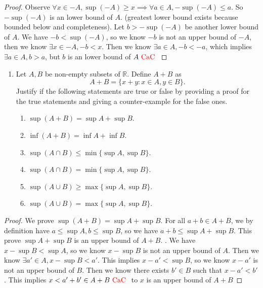\documentclass{report}
\begin{document}
\begin{proof}
Observe $\forall x\in -A, \sup (-A)\geq  x\implies \forall a \in A, -\sup (-A)\leq  a$. So $-\sup (-A)$ is an lower bound of $A$.  (greatest lower bound exists because bounded below and completeness). Let $b>-\sup (-A)$ be another lower bound of $A$. We have $-b<\sup (-A)$, so we know $-b$ is not an upper bound of $-A$, then we know  $\exists x \in -A, -b<x$. Then we know $\exists a \in A, -b<-a$, which implies $\exists a \in A, b>a$, but $b$ is an lower bound of $A\text{ \textcolor{red}{CaC} }$
\end{proof}
\begin{question}{}{}
\begin{enumerate}
    \item Let \( A, B \) be non-empty subsets of \( \mathbb{R} \). Define \( A+B \) as 
    \[ A+B = \{ x+y : x \in A, y \in B \}. \]
    Justify if the following statements are true or false by providing a proof for the true statements and giving a counter-example for the false ones.
    \begin{enumerate}
        \item \( \sup(A+B) = \sup A + \sup B \).
        \item \( \inf(A+B) = \inf A + \inf B \).
        \item \( \sup(A \cap B) \leq \min\{\sup A, \sup B\} \).
        \item \( \sup(A \cap B) = \min\{\sup A, \sup B\} \).
        \item \( \sup(A \cup B) \geq \max\{\sup A, \sup B\} \).
        \item \( \sup(A \cup B) = \max\{\sup A, \sup B\} \).
    \end{enumerate}
\end{enumerate}
\end{question}
\begin{proof}
We prove $\sup (A+B)=\sup A+\sup B$. For all $a+b \in A+B$, we by definition have $a\leq \sup A, b\leq \sup B$, so we have $a+b\leq \sup A+\sup B$. This prove $\sup A+\sup B$ is an upper bound of $A+B$. . We have $x-\sup B<\sup A$, so we know $x-\sup B$ is not an upper bound of $A$. Then we know  $\exists a'\in A, x-\sup B<a'$. This implies $x-a'< \sup B$, so we know $x-a'$ is not an upper bound of  $B$. Then we know there exists  $b' \in B$ such that $x-a'< b'$. This implies $x<a'+b' \in A+B\text{ \textcolor{red}{CaC} }$ to $x$ is an upper bound of  $A+B$
\end{proof}
\end{document}
